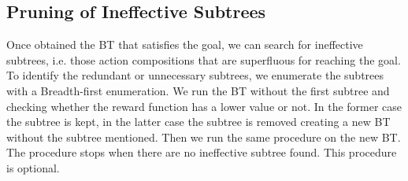 %
%
%






%
%
%
%
%
\subsection{Pruning of Ineffective Subtrees}
\label{PA.removal}
Once obtained the BT that satisfies the goal, we can search for ineffective subtrees, i.e. those action compositions that are superfluous for reaching the goal. To identify the redundant or unnecessary subtrees, we enumerate the subtrees with a Breadth-first enumeration. We run the BT without the first subtree and checking whether the reward function has a lower value or not. In the former case the subtree is kept, in the latter case the subtree is removed creating a new BT without the subtree mentioned. Then we run the same procedure on the new BT. The procedure stops when there are no ineffective subtree found. This procedure is optional.




